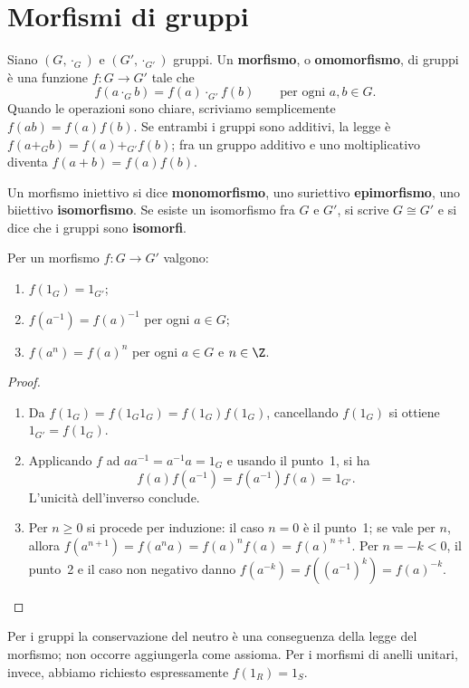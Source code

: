 \section{Morfismi di gruppi}
\begin{definizione}
Siano $(G,\cdot_G)$ e $(G',\cdot_{G'})$ gruppi. Un \textbf{morfismo}, o \textbf{omomorfismo}, di gruppi è una funzione $f:G\to G'$ tale che
\[
f(a\cdot_G b)=f(a)\cdot_{G'}f(b)\qquad\text{per ogni }a,b\in G.
\]
Quando le operazioni sono chiare, scriviamo semplicemente $f(ab)=f(a)f(b)$. Se entrambi i gruppi sono additivi, la legge è $f(a+_G b)=f(a)+_{G'}f(b)$; fra un gruppo additivo e uno moltiplicativo diventa $f(a+b)=f(a)f(b)$.

Un morfismo iniettivo si dice \textbf{monomorfismo}, uno suriettivo \textbf{epimorfismo}, uno biiettivo \textbf{isomorfismo}. Se esiste un isomorfismo fra $G$ e $G'$, si scrive $G\cong G'$ e si dice che i gruppi sono \textbf{isomorfi}.
\end{definizione}

\begin{proposizione}\label{prop:morfismi-gruppi}
Per un morfismo $f:G\to G'$ valgono:
\begin{enumerate}[label=\arabic*.]
\item $f(1_G)=1_{G'}$;
\item $f(a^{-1})=f(a)^{-1}$ per ogni $a\in G$;
\item $f(a^n)=f(a)^n$ per ogni $a\in G$ e $n\in\Z$.
\end{enumerate}
\end{proposizione}
\begin{proof}
\begin{enumerate}[label=\arabic*.]
\item Da $f(1_G)=f(1_G1_G)=f(1_G)f(1_G)$, cancellando $f(1_G)$ si ottiene $1_{G'}=f(1_G)$.
\item Applicando $f$ ad $aa^{-1}=a^{-1}a=1_G$ e usando il punto~1, si ha
\[
f(a)f(a^{-1})=f(a^{-1})f(a)=1_{G'}.
\]
L'unicità dell'inverso conclude.
\item Per $n\ge0$ si procede per induzione: il caso $n=0$ è il punto~1; se vale per $n$, allora $f(a^{n+1})=f(a^na)=f(a)^nf(a)=f(a)^{n+1}$. Per $n=-k<0$, il punto~2 e il caso non negativo danno $f(a^{-k})=f((a^{-1})^k)=f(a)^{-k}$.
\end{enumerate}
\end{proof}

Per i gruppi la conservazione del neutro è una conseguenza della legge del morfismo; non occorre aggiungerla come assioma. Per i morfismi di anelli unitari, invece, abbiamo richiesto espressamente $f(1_R)=1_S$.

